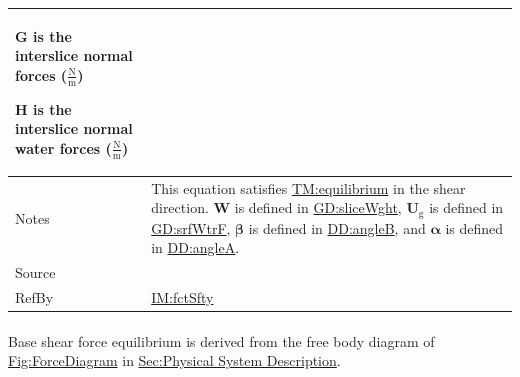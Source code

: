\documentclass[12pt]{article}
\begin{document}
\begin{minipage}{\textwidth}
\begin{tabular}{>{\raggedright}p{}>{\raggedright\arraybackslash}p{}}
\begin{symbDescription}
              \item{$\symbf{G}$ is the interslice normal forces ($\frac{\text{N}}{\text{m}}$)}
              \item{$\symbf{H}$ is the interslice normal water forces ($\frac{\text{N}}{\text{m}}$)}
              \end{symbDescription}
\\ \midrule
Notes & This equation satisfies \hyperref[TM:equilibrium]{TM:equilibrium} in the shear direction. $\symbf{W}$ is defined in \hyperref[GD:sliceWght]{GD:sliceWght}, ${\symbf{U}_{\text{g}}}$ is defined in \hyperref[GD:srfWtrF]{GD:srfWtrF}, $\symbf{β}$ is defined in \hyperref[DD:angleB]{DD:angleB}, and $\symbf{α}$ is defined in \hyperref[DD:angleA]{DD:angleA}.
        
\\ \midrule
Source & \cite{chen2005}
         
\\ \midrule
RefBy & \hyperref[IM:fctSfty]{IM:fctSfty}
        
\\ \bottomrule
\end{tabular}
\end{minipage}

\paragraph{}
\label{GD:bsShrFEqDeriv}
Base shear force equilibrium is derived from the free body diagram of \hyperref[Figure:ForceDiagram]{Fig:ForceDiagram} in \hyperref[Sec:PhysSyst]{Sec:Physical System Description}.
\end{document}
